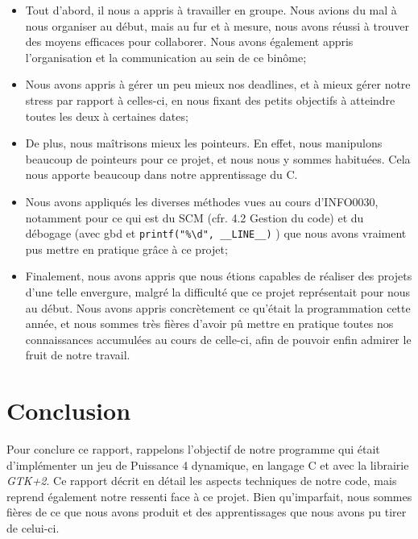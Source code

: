 \documentclass[a4paper, 11pt, oneside]{article}
\begin{document}
\begin{itemize}
    \item Tout d'abord, il nous a appris à travailler en groupe. Nous avions du mal à nous organiser au début, mais au fur et à mesure, nous avons réussi à trouver des moyens efficaces pour collaborer. Nous avons également appris l'organisation et la communication au sein de ce binôme;
    
    \item Nous avons appris à gérer un peu mieux nos deadlines, et à mieux gérer notre stress par rapport à celles-ci, en nous fixant des petits objectifs à atteindre toutes les deux à certaines dates;
    
    \item De plus, nous maîtrisons mieux les pointeurs. En effet, nous manipulons beaucoup de pointeurs pour ce projet, et nous nous y sommes habituées. Cela nous apporte beaucoup dans notre apprentissage du C.

    \item Nous avons appliqués les diverses méthodes vues au cours d'INFO0030, notamment pour ce qui est du SCM (cfr. 4.2 Gestion du code) et du débogage (avec gbd et \texttt{printf("\%\textbackslash d", \_\_LINE\_\_)} ) que nous avons vraiment pus mettre en pratique grâce à ce projet;

    \item Finalement, nous avons appris que nous étions capables de réaliser des projets d'une telle envergure, malgré la difficulté que ce projet représentait pour nous au début. Nous avons appris concrètement ce qu'était la programmation cette année, et nous sommes très fières d'avoir pû mettre en pratique toutes nos connaissances accumulées au cours de celle-ci, afin de pouvoir enfin admirer le fruit de notre travail.
\end{itemize}

\section{Conclusion}

Pour conclure ce rapport, rappelons l'objectif de notre programme qui était d'implémenter un jeu de Puissance 4 dynamique, en langage C et avec la librairie \emph{GTK+2}. Ce rapport décrit en détail les aspects techniques de notre code, mais reprend également notre ressenti face à ce projet. Bien qu'imparfait, nous sommes fières de ce que nous avons produit et des apprentissages que nous avons pu tirer de celui-ci.
\end{document}
